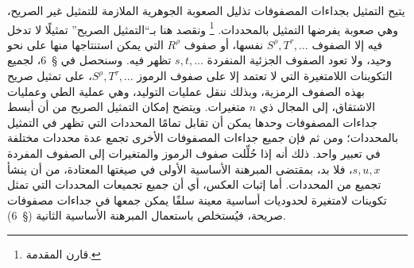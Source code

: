 \documentclass[11pt]{article}
\begin{document}
يتيح التمثيل بجداءات المصفوفات تذليل الصعوبة الجوهرية الملازمة للتمثيل غير الصريح، وهي صعوبة يفرضها التمثيل بالمحددات.
\footnote{قارن المقدمة.}
ونقصد هنا بـ``التمثيل الصريح'' تمثيلًا لا تدخل فيه إلا الصفوف $S^\rho,T^\tau,\ldots$ نفسها، أو صفوف $R^\rho$ التي يمكن استنتاجها منها على نحو وحيد، ولا تعود الصفوف الجزئية المنفردة $s,t,\ldots$ تظهر فيه. وسنحصل في \S\ 6، لجميع التكوينات اللامتغيرة التي لا تعتمد إلا على صفوف الرموز $S^\rho,T^\tau,\ldots$، على تمثيل صريح بهذه الصفوف الرمزية، وبذلك ننقل عمليات التوليد، وهي عملية الطي وعمليات الاشتقاق، إلى المجال ذي $n$ متغيرات. ويتضح إمكان التمثيل الصريح من أن أبسط جداءات المصفوفات وحدها يمكن أن تقابل تمامًا المحددات التي تظهر في التمثيل بالمحددات؛ ومن ثم فإن جميع جداءات المصفوفات الأخرى تجمع عدة محددات مختلفة في تعبير واحد. ذلك أنه إذا حُلِّلت صفوف الرموز والمتغيرات إلى الصفوف المفردة $s,u,x$، فلا بد، بمقتضى المبرهنة الأساسية الأولى في صيغتها المعتادة، من أن ينشأ تجميع من المحددات. أما إثبات العكس، أي أن جميع تجميعات المحددات التي تمثل تكوينات لامتغيرة لحدوديات أساسية معينة سلفًا يمكن جمعها في جداءات مصفوفات صريحة، فيُستخلص باستعمال المبرهنة الأساسية الثانية (\S\ 6).
\end{document}
